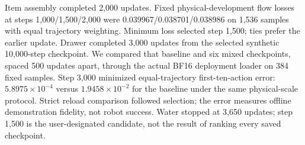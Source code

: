 Item assembly completed 2,000 updates. Fixed physical-development flow losses
at steps 1,000/1,500/2,000 were 0.039967/0.038701/0.038986 on 1,536 samples
with equal trajectory weighting. Minimum loss selected step 1,500; ties
prefer the earlier update. Drawer completed 3,000 updates from the selected
synthetic 10,000-step checkpoint. We compared that baseline and six mixed
checkpoints, spaced 500 updates apart, through the actual BF16 deployment
loader on 384 fixed samples. Step 3,000 minimized equal-trajectory
first-ten-action error: $5.8975\times10^{-4}$ versus
$1.9458\times10^{-2}$ for the baseline under the same physical-scale protocol.
Strict reload comparison followed selection; the error measures offline
demonstration fidelity, not robot success. Water stopped at 3,650 updates;
step 1,500 is the user-designated candidate, not the result of ranking every
saved checkpoint.

